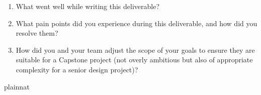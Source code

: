 \documentclass{article}
\begin{document}



\begin{enumerate}
    \item What went well while writing this deliverable? 
    \item What pain points did you experience during this deliverable, and how
    did you resolve them?
    \item How did you and your team adjust the scope of your goals to ensure
    they are suitable for a Capstone project (not overly ambitious but also of
    appropriate complexity for a senior design project)?
\end{enumerate}  

 {plainnat}

\end{document}
